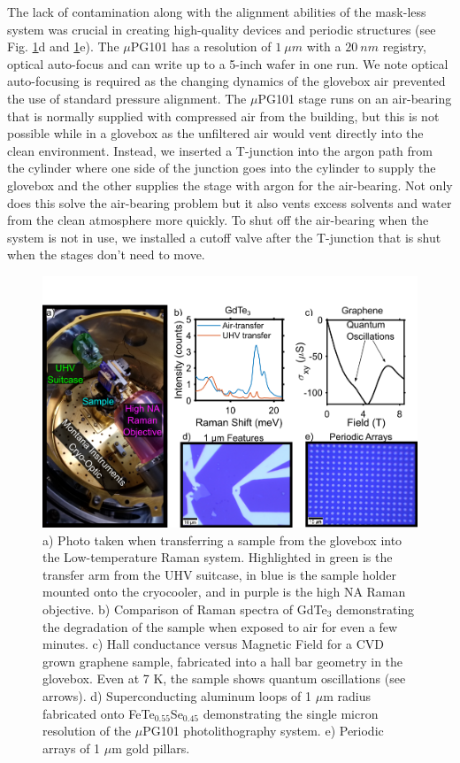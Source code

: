 The lack of contamination along with the alignment abilities of the mask-less system was crucial in creating high-quality devices and periodic structures (see Fig. \ref{fig:FabricationFigure}d and \ref{fig:FabricationFigure}e). The $\mu$PG101 has a resolution of $1~\mu m$ with a $20~nm$ registry, optical auto-focus and can write up to a 5-inch wafer in one run. We note optical auto-focusing is required as the changing dynamics of the glovebox air prevented the use of standard pressure alignment. The $\mu$PG101 stage runs on an air-bearing that is normally supplied with compressed air from the building, but this is not possible while in a glovebox as the unfiltered air would vent directly into the clean environment. Instead, we inserted a T-junction into the argon path from the cylinder where one side of the junction goes into the cylinder to supply the glovebox and the other supplies the stage with argon for the air-bearing. Not only does this solve the air-bearing problem but it also vents excess solvents and water from the clean atmosphere more quickly. To shut off the air-bearing when the system is not in use, we installed a cutoff valve after the T-junction that is shut when the stages don't need to move.
\par

\begin{figure}
    \centering
    \includegraphics[width=\textwidth]{Chap2/Figures/FabricationFigure.png}
    \caption{a) Photo taken when transferring a sample from the glovebox into the Low-temperature Raman system. Highlighted in green is the transfer arm from the UHV suitcase, in blue is the sample holder mounted onto the cryocooler, and in purple is the high NA Raman objective. b) Comparison of Raman spectra of GdTe$_{3}$ demonstrating the degradation of the sample when exposed to air for even a few minutes. c) Hall conductance versus Magnetic Field for a CVD grown graphene sample, fabricated into a hall bar geometry in the glovebox. Even at 7 K, the sample shows quantum oscillations (see arrows). d) Superconducting aluminum loops of 1 $\mu$m radius fabricated onto FeTe$_{0.55}$Se$_{0.45}$ demonstrating the single micron resolution of the $\mu$PG101 photolithography system. e) Periodic arrays of 1 $\mu$m gold pillars.}
    \label{fig:FabricationFigure}
\end{figure}

